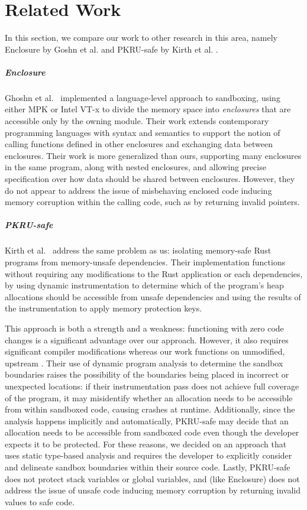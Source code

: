\chapter{Related Work}

In this section, we compare our work to other research in this area, namely Enclosure by Goshn et
al. \cite{ghoshn:enclosure} and PKRU-safe by Kirth et al. \cite{kirth:pkru}.

\paragraph{Enclosure} Ghoshn et al.~\cite{ghoshn:enclosure} implemented a language-level approach to
sandboxing, using either MPK or Intel VT-x to divide the memory space into \textit{enclosures} that
are accessible only by the owning module. Their work extends contemporary programming languages with
syntax and semantics to support the notion of calling functions defined in other enclosures and
exchanging data between enclosures. Their work is more generalized than ours, supporting many
enclosures in the same program, along with nested enclosures, and allowing precise specification
over how data should be shared between enclosures. However, they do not appear to address the issue
of misbehaving enclosed code inducing memory corruption within the calling code, such as by
returning invalid pointers.

\paragraph{PKRU-safe} Kirth et al.~\cite{kirth:pkru} address the same problem as us: isolating memory-safe Rust
programs from memory-unsafe dependencies. Their implementation functions without requiring any
modifications to the Rust application or each dependencies, by using dynamic instrumentation to
determine which of the program's heap allocations should be accessible from unsafe dependencies and
using the results of the instrumentation to apply memory protection keys.

This approach is both a strength and a weakness: functioning with zero code changes is a significant
advantage over our approach. However, it also requires significant compiler modifications whereas
our work functions on unmodified, upstream . Their use of dynamic program analysis to
determine the sandbox boundaries raises the possibility of the boundaries being placed in incorrect
or unexpected locations: if their instrumentation pass does not achieve full coverage of the
program, it may misidentify whether an allocation needs to be accessible from within sandboxed code,
causing crashes at runtime. Additionally, since the analysis happens implicitly and automatically,
PKRU-safe may decide that an allocation needs to be accessible from sandboxed code even though the
developer expects it to be protected. For these reasons, we decided on an approach that uses static
type-based analysis and requires the developer to explicitly consider and delineate sandbox
boundaries within their source code. Lastly, PKRU-safe does not protect stack variables or global
variables, and (like Enclosure) does not address the issue of unsafe code inducing memory corruption
by returning invalid values to safe code.

